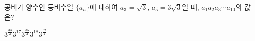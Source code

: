 공비가 양수인 등비수열 $\{a_n\}$에 대하여 $a_3=\sqrt{3}$, $a_5=3\sqrt{3}$일 때, $a_1a_2a_3\cdots a_{10}$의 값은?
\begin{choices32}{$3^{\frac{33}{2}}$}{$3^{17}$}{$3^{\frac{35}{2}}$}{$3^{18}$}{$3^{\frac{37}{2}}$}\end{choices32}
